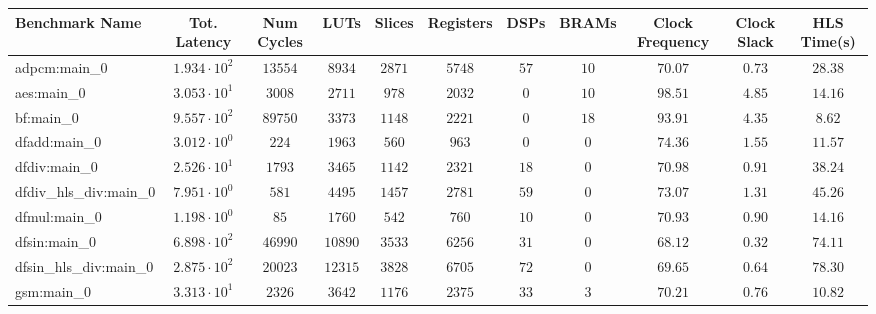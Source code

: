 \begin{tabular}{|l|c|c|c|c|c|c|c|c|c|c|}
\hline
Benchmark Name          & Tot. Latency           & Num Cycles & LUTs      & Slices    & Registers & DSPs    & BRAMs   & Clock Frequency & Clock Slack & HLS Time(s) \\
\hline
adpcm:main\_0           & $ 1.934 \cdot 10^{2} $ & $ 13554  $ & $ 8934  $ & $ 2871  $ & $ 5748  $ & $ 57  $ & $ 10  $ & $ 70.07       $ & $ 0.73    $ & $ 28.38   $ \\
aes:main\_0             & $ 3.053 \cdot 10^{1} $ & $ 3008   $ & $ 2711  $ & $ 978   $ & $ 2032  $ & $ 0   $ & $ 10  $ & $ 98.51       $ & $ 4.85    $ & $ 14.16   $ \\
bf:main\_0              & $ 9.557 \cdot 10^{2} $ & $ 89750  $ & $ 3373  $ & $ 1148  $ & $ 2221  $ & $ 0   $ & $ 18  $ & $ 93.91       $ & $ 4.35    $ & $ 8.62    $ \\
dfadd:main\_0           & $ 3.012 \cdot 10^{0} $ & $ 224    $ & $ 1963  $ & $ 560   $ & $ 963   $ & $ 0   $ & $ 0   $ & $ 74.36       $ & $ 1.55    $ & $ 11.57   $ \\
dfdiv:main\_0           & $ 2.526 \cdot 10^{1} $ & $ 1793   $ & $ 3465  $ & $ 1142  $ & $ 2321  $ & $ 18  $ & $ 0   $ & $ 70.98       $ & $ 0.91    $ & $ 38.24   $ \\
dfdiv\_hls\_div:main\_0 & $ 7.951 \cdot 10^{0} $ & $ 581    $ & $ 4495  $ & $ 1457  $ & $ 2781  $ & $ 59  $ & $ 0   $ & $ 73.07       $ & $ 1.31    $ & $ 45.26   $ \\
dfmul:main\_0           & $ 1.198 \cdot 10^{0} $ & $ 85     $ & $ 1760  $ & $ 542   $ & $ 760   $ & $ 10  $ & $ 0   $ & $ 70.93       $ & $ 0.90    $ & $ 14.16   $ \\
dfsin:main\_0           & $ 6.898 \cdot 10^{2} $ & $ 46990  $ & $ 10890 $ & $ 3533  $ & $ 6256  $ & $ 31  $ & $ 0   $ & $ 68.12       $ & $ 0.32    $ & $ 74.11   $ \\
dfsin\_hls\_div:main\_0 & $ 2.875 \cdot 10^{2} $ & $ 20023  $ & $ 12315 $ & $ 3828  $ & $ 6705  $ & $ 72  $ & $ 0   $ & $ 69.65       $ & $ 0.64    $ & $ 78.30   $ \\
gsm:main\_0             & $ 3.313 \cdot 10^{1} $ & $ 2326   $ & $ 3642  $ & $ 1176  $ & $ 2375  $ & $ 33  $ & $ 3   $ & $ 70.21       $ & $ 0.76    $ & $ 10.82   $ \\

\end{tabular}
